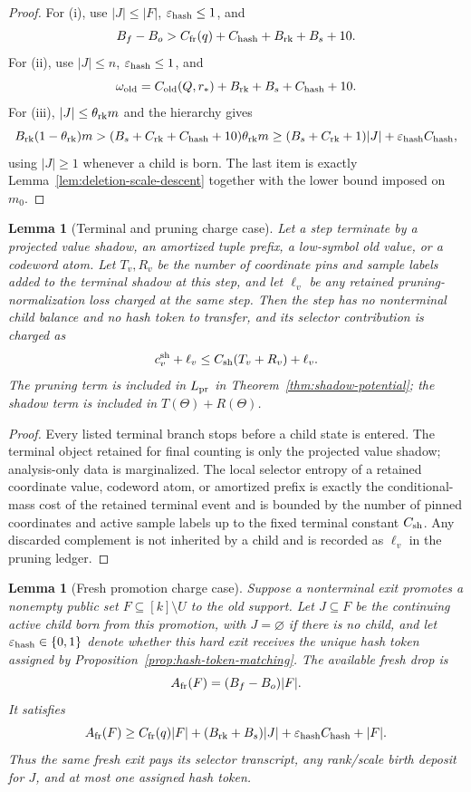 \documentclass[11pt]{article}
\newtheorem{lemma}[theorem]{Lemma}
\begin{document}
\begin{proof}
For (i), use $|J|\le |F|$, $\varepsilon_{\rm hash}\le1$, and
\[
  B_f-B_o>C_{\rm fr}(q)+C_{\rm hash}+B_{\rm rk}+B_s+10 .
\]
For (ii), use $|J|\le n$, $\varepsilon_{\rm hash}\le1$, and
\[
  \omega_{\rm old}=C_{\rm old}(Q,r_*)+B_{\rm rk}+B_s+C_{\rm hash}+10 .
\]
For (iii), $|J|\le\theta_{\rm rk}m$ and the hierarchy gives
\[
  B_{\rm rk}(1-\theta_{\rm rk})m
  >(B_s+C_{\rm rk}+C_{\rm hash}+10)\theta_{\rm rk}m
  \ge (B_s+C_{\rm rk}+1)|J|+\varepsilon_{\rm hash}C_{\rm hash},
\]
using $|J|\ge1$ whenever a child is born.
The last item is exactly Lemma~\ref{lem:deletion-scale-descent} together with
the lower bound imposed on $m_0$.
\end{proof}

\begin{lemma}[Terminal and pruning charge case]
\label{lem:terminal-pruning-charge-case}
Let a step terminate by a projected value shadow, an amortized tuple prefix, a
low-symbol old value, or a codeword atom.  Let $T_v,R_v$ be the number of
coordinate pins and sample labels added to the terminal shadow at this step, and
let $\ell_v$ be any retained pruning-normalization loss charged at the same
step.  Then the step has no nonterminal child balance and no hash token to
transfer, and its selector contribution is charged as
\[
  c_v^{\rm sh}+\ell_v
  \le C_{\rm sh}(T_v+R_v)+\ell_v .
\]
The pruning term is included in $L_{\rm pr}$ in
Theorem~\ref{thm:shadow-potential}; the shadow term is included in
$T(\Theta)+R(\Theta)$.
\end{lemma}

\begin{proof}
Every listed terminal branch stops before a child state is entered.  The
terminal object retained for final counting is only the projected value shadow;
analysis-only data is marginalized.  The local selector entropy of a retained
coordinate value, codeword atom, or amortized prefix is exactly the
conditional-mass cost of the retained terminal event and is bounded by the
number of pinned coordinates and active sample labels up to the fixed terminal
constant $C_{\rm sh}$.  Any discarded complement is not inherited by a child and
is recorded as $\ell_v$ in the pruning ledger.
\end{proof}

\begin{lemma}[Fresh promotion charge case]
\label{lem:fresh-charge-case}
Suppose a nonterminal exit promotes a nonempty public set
$F\subseteq [k]\setminus U$ to the old support.  Let $J\subseteq F$ be the
continuing active child born from this promotion, with $J=\varnothing$ if there
is no child, and let $\varepsilon_{\rm hash}\in\{0,1\}$ denote whether this hard
exit receives the unique hash token assigned by
Proposition~\ref{prop:hash-token-matching}.  The available fresh drop is
\[
  A_{\rm fr}(F)=(B_f-B_o)|F|.
\]
It satisfies
\[
  A_{\rm fr}(F)
  \ge
  C_{\rm fr}(q)|F|+(B_{\rm rk}+B_s)|J|
  +\varepsilon_{\rm hash}C_{\rm hash}+|F|.
\]
Thus the same fresh exit pays its selector transcript, any rank/scale birth
deposit for $J$, and at most one assigned hash token.
\end{lemma}
\end{document}
